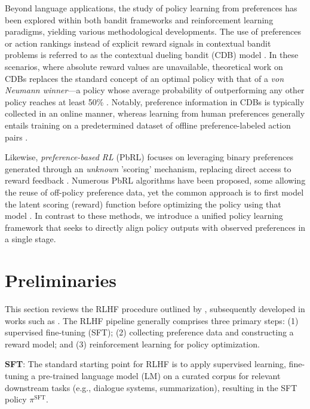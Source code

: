 Beyond language applications, the study of policy learning from preferences has been explored within both bandit frameworks and reinforcement learning paradigms, yielding various methodological developments. The use of preferences or action rankings instead of explicit reward signals in contextual bandit problems is referred to as the contextual dueling bandit (CDB) model \citep{yue2012karmed,dudik2015contextual}. In these scenarios, where absolute reward values are unavailable, theoretical work on CDBs replaces the standard concept of an optimal policy with that of a \textit{von Neumann winner}—a policy whose average probability of outperforming any other policy reaches at least 50\% \citep{dudik2015contextual}. Notably, preference information in CDBs is typically collected in an online manner, whereas learning from human preferences generally entails training on a predetermined dataset of offline preference-labeled action pairs \citep{yan2022human}. 

Likewise, \textit{preference-based RL} (PbRL) focuses on leveraging binary preferences generated through an \textit{unknown} 'scoring' mechanism, replacing direct access to reward feedback \citep{BusaFekete2014,ruiz2023dueling}. Numerous PbRL algorithms have been proposed, some allowing the reuse of off-policy preference data, yet the common approach is to first model the latent scoring (reward) function before optimizing the policy using that model \citep{jain2013learning,BusaFekete2014,christiano2017deep,sadigh2017active,kupcsik2018learning}. In contrast to these methods, we introduce a unified policy learning framework that seeks to directly align policy outputs with observed preferences in a single stage.

\section{Preliminaries}\label{section:prelims}

This section reviews the RLHF procedure outlined by \citeauthor{ziegler2020finetuning}, subsequently developed in works such as \citep{stiennon2022learning, bai2022training, ouyang2022training}. The RLHF pipeline generally comprises three primary steps: (1) supervised fine-tuning (SFT); (2) collecting preference data and constructing a reward model; and (3) reinforcement learning for policy optimization.

\textbf{SFT}: The standard starting point for RLHF is to apply supervised learning, fine-tuning a pre-trained language model (LM) on a curated corpus for relevant downstream tasks (e.g., dialogue systems, summarization), resulting in the SFT policy $\pi^\text{SFT}$.

